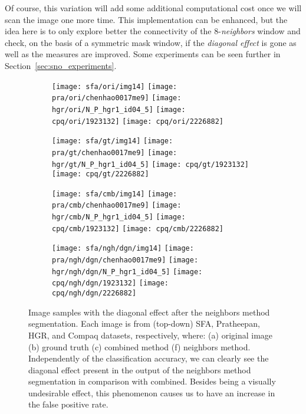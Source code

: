 Of course, this variation will add some additional computational cost once we will scan the image one more time. This implementation can be enhanced, but the idea here is to only explore better the connectivity of the 8-\textit{neighbors} window and check, on the basis of a symmetric mask window, if the \textit{diagonal effect} is gone as well as the measures are improved. Some experiments can be seen further in Section~\ref{sec:sno_experiments}.

\begin{figure*}[!htb]
    \centering
    \begin{subfigure}[t]{0.18\textwidth}
        \texttt{[image: sfa/ori/img14]}
        \texttt{[image: pra/ori/chenhao0017me9]}
        \texttt{[image: hgr/ori/N\_P\_hgr1\_id04\_5]}
        \texttt{[image: cpq/ori/1923132]}
        \texttt{[image: cpq/ori/2226882]}
        \caption{}
    \end{subfigure}
    \begin{subfigure}[t]{0.18\textwidth}
        \texttt{[image: sfa/gt/img14]}
        \texttt{[image: pra/gt/chenhao0017me9]}
        \texttt{[image: hgr/gt/N\_P\_hgr1\_id04\_5]}
        \texttt{[image: cpq/gt/1923132]}
        \texttt{[image: cpq/gt/2226882]}
        \caption{}
    \end{subfigure}
    \begin{subfigure}[t]{0.18\textwidth}
        \texttt{[image: sfa/cmb/img14]}
        \texttt{[image: pra/cmb/chenhao0017me9]}
        \texttt{[image: hgr/cmb/N\_P\_hgr1\_id04\_5]}
        \texttt{[image: cpq/cmb/1923132]}
        \texttt{[image: cpq/cmb/2226882]}
        \caption{}
    \end{subfigure}
    \begin{subfigure}[t]{0.18\textwidth}
        \texttt{[image: sfa/ngh/dgn/img14]}
        \texttt{[image: pra/ngh/dgn/chenhao0017me9]}
        \texttt{[image: hgr/ngh/dgn/N\_P\_hgr1\_id04\_5]}
        \texttt{[image: cpq/ngh/dgn/1923132]}
        \texttt{[image: cpq/ngh/dgn/2226882]}
        \caption{}
    \end{subfigure}

    \caption[Image samples with the diagonal effect after the neighbors method segmentation]{Image samples with the diagonal effect after the neighbors method segmentation. Each image is from (top-down) SFA, Pratheepan, HGR, and Compaq datasets, respectively, where: (a) original image (b) ground truth (c) combined method (f) neighbors method. Independently of the classification accuracy, we can clearly see the diagonal effect present in the output of the neighbors method segmentation in comparison with combined. Besides being a visually undesirable effect, this phenomenon causes us to have an increase in the false positive rate.}
    \label{fig:diagonal_effect}
\end{figure*}